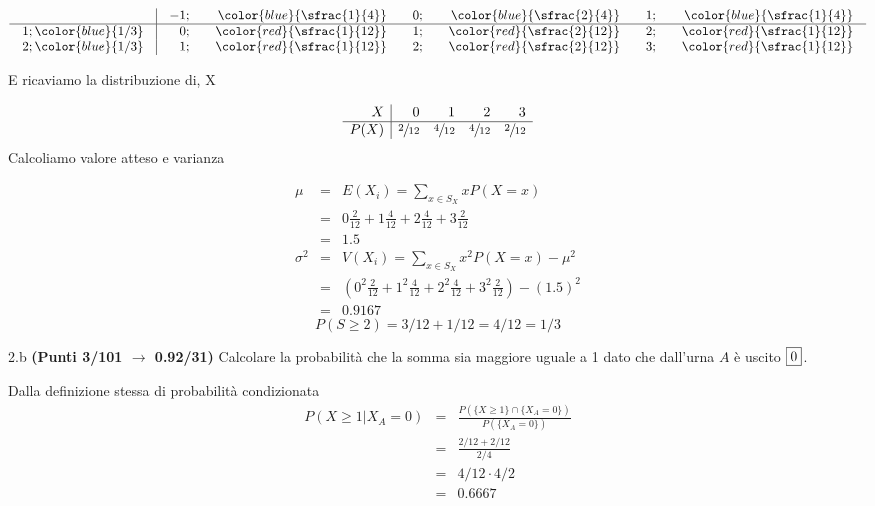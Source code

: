 \documentclass[
  11pt,
]{book}
\theoremstyle{mytheoremstyle}
\theoremstyle{mydefstyle}
\newenvironment{sol}
  {
  \begin{tcolorbox}[enhanced,breakable,arc=0.1mm,boxrule=1pt,colback=white,colframe=iblue,
  title=\bf \fontfamily{lmss}\selectfont \hspace{.5 cm} Soluzione,drop fuzzy shadow]

}{
\end{tcolorbox}
  }
\begin{document}
\begin{sol}

\normalsize

\[\arraycolsep=10pt\def\arraystretch{1}\begin{array}{ r|rrrrrr }
& -1 ;&\color{blue}{ \sfrac{ 1 } { 4 }} & 0 ;&\color{blue}{ \sfrac{ 2 } { 4 }} & 1 ;&\color{blue}{ \sfrac{ 1 } { 4 }} \\ 
\hline 
1 ;\color{blue}{ 1 / 3 }& 0;&\color{red}{\sfrac{1}{12}}& 1;&\color{red}{\sfrac{2}{12}}& 2;&\color{red}{\sfrac{1}{12}}\\ 
2 ;\color{blue}{ 1 / 3 }& 1;&\color{red}{\sfrac{1}{12}}& 2;&\color{red}{\sfrac{2}{12}}& 3;&\color{red}{\sfrac{1}{12}}\\ 
\end{array}
 \]

\normalsize E ricaviamo la distribuzione di, X

\normalsize

\[
     \begin{array}{ r|rrrr }
 X  & 0& 1& 2& 3 \\ 
 \hline 
 P( X ) & \sfrac{2}{12}& \sfrac{4}{12}& \sfrac{4}{12}& \sfrac{2}{12} \\ 
 \end{array}
 \]
\normalsize Calcoliamo valore atteso e varianza

\normalsize

\begin{eqnarray*} \mu &=& E(X_i) = \sum_{x\in S_X}x P(X=x)\\ 
 &=&  0  \frac { 2 }{ 12 }+ 1  \frac { 4 }{ 12 }+ 2  \frac { 4 }{ 12 }+ 3  \frac { 2 }{ 12 } \\ 
            &=& 1.5 \\ 
 \sigma^2 &=& V(X_i) = \sum_{x\in S_X}x^2 P(X=x)-\mu^2\\ 
 &=&\left(  0  ^2\frac { 2 }{ 12 }+ 1  ^2\frac { 4 }{ 12 }+ 2  ^2\frac { 4 }{ 12 }+ 3  ^2\frac { 2 }{ 12 } \right)-( 1.5 )^2\\ 
            &=& 0.9167 
\end{eqnarray*}
\normalsize
\[
P(S\ge 2)=3/12+1/12=4/12=1/3
\]

\end{sol}

2.b \textbf{(Punti 3/101 \(\rightarrow\) 0.92/31)} Calcolare la probabilità che la somma sia maggiore uguale a 1 dato che dall'urna \(A\) è uscito \(\fbox{0}\).

\begin{sol}
Dalla definizione stessa di probabilità condizionata
\begin{eqnarray*}
P(X\geq 1|X_A=0)&=&\frac{P(\{X\geq 1\}\cap\{X_A=0\})}{P(\{X_A=0\})}\\
                &=&\frac{2/12+2/12}{2/4}\\
                &=&4/12\cdot4/2\\
                &=&0.6667
\end{eqnarray*}

\end{sol}
\end{document}
